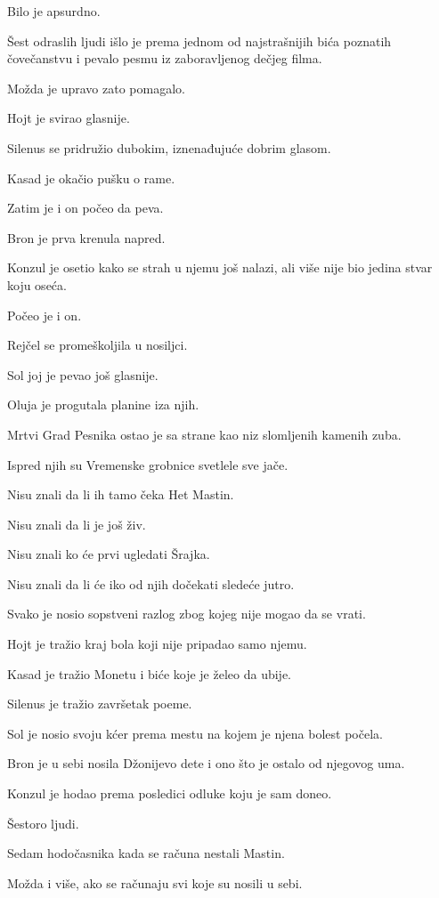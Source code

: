 \bigskip

Bilo je apsurdno.

Šest odraslih ljudi išlo je prema jednom od najstrašnijih bića poznatih čovečanstvu i pevalo pesmu iz zaboravljenog dečjeg filma.

Možda je upravo zato pomagalo.

Hojt je svirao glasnije.

Silenus se pridružio dubokim, iznenađujuće dobrim glasom.

Kasad je okačio pušku o rame.

Zatim je i on počeo da peva.

Bron je prva krenula napred.

Konzul je osetio kako se strah u njemu još nalazi, ali više nije bio jedina stvar koju oseća.

Počeo je i on.

Rejčel se promeškoljila u nosiljci.

Sol joj je pevao još glasnije.

\bigskip

Oluja je progutala planine iza njih.

Mrtvi Grad Pesnika ostao je sa strane kao niz slomljenih kamenih zuba.

Ispred njih su Vremenske grobnice svetlele sve jače.

Nisu znali da li ih tamo čeka Het Mastin.

Nisu znali da li je još živ.

Nisu znali ko će prvi ugledati Šrajka.

Nisu znali da li će iko od njih dočekati sledeće jutro.

Svako je nosio sopstveni razlog zbog kojeg nije mogao da se vrati.

Hojt je tražio kraj bola koji nije pripadao samo njemu.

Kasad je tražio Monetu i biće koje je želeo da ubije.

Silenus je tražio završetak poeme.

Sol je nosio svoju kćer prema mestu na kojem je njena bolest počela.

Bron je u sebi nosila Džonijevo dete i ono što je ostalo od njegovog uma.

Konzul je hodao prema posledici odluke koju je sam doneo.

Šestoro ljudi.

Sedam hodočasnika kada se računa nestali Mastin.

Možda i više, ako se računaju svi koje su nosili u sebi.

